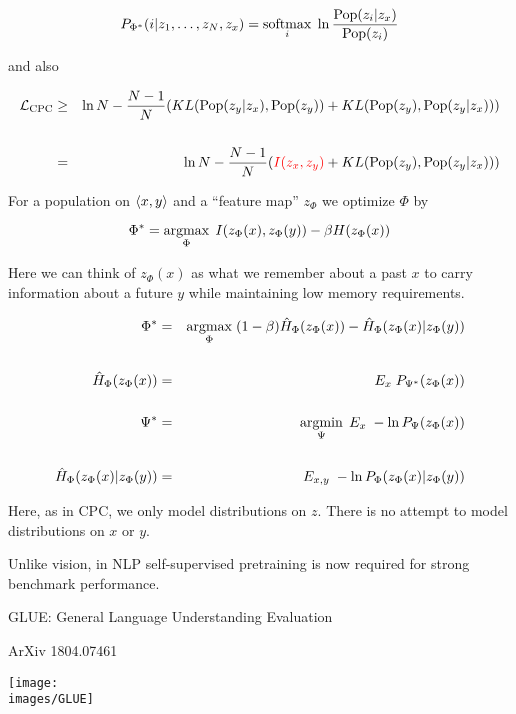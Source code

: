 {$$P_{\Phi^*}(i|z_1,\ldots,z_N,z_x) = \operatorname*{softmax}_i \;\ln \frac{\mathrm{Pop}(z_i|z_x)}{\mathrm{Pop}(z_i)}$$

and also

{\huge
\begin{eqnarray*}
{\cal L}_\mathrm{CPC} & \geq & \ln N - \frac{N-1}{N}(KL(\mathrm{Pop}(z_y|z_x),\mathrm{Pop}(z_y)) + KL(\mathrm{Pop}(z_y),\mathrm{Pop}(z_y|z_x))) \\
\\
& = & \ln N - \frac{N-1}{N}({\color{red} I(z_x,z_y)} + KL(\mathrm{Pop}(z_y),\mathrm{Pop}(z_y|z_x)))
\end{eqnarray*}
}


For a population on ${\mbox{$\langle x,y\rangle$}}$ and a ``feature map'' $z_\Phi$ we optimize $\Phi$ by

\vfill
$$\Phi^* = \operatorname*{argmax}_\Phi \; I(z_\Phi(x),z_\Phi(y)) - \beta H(z_\Phi(x))$$


\vfill
Here we can think of $z_\Phi(x)$ as what we remember about a past $x$ to carry information about a future $y$ while maintaining low memory requirements.


\begin{eqnarray*}
\Phi^* & = & \operatorname*{argmax}_\Phi \; (1-\beta)\hat{H}_\Phi(z_\Phi(x)) - \hat{H}_\Phi(z_\Phi(x)|z_\Phi(y)) \\
\\
\hat{H}_\Phi(z_\Phi(x)) & = & E_x \; P_{\Psi^*}(z_\Phi(x)) \\
\\
\Psi^* & = & \operatorname*{argmin}_\Psi\;E_x\;-\ln P_\Psi(z_\Phi(x)) \\
\\
\hat{H}_\Phi(z_\Phi(x)|z_\Phi(y)) & = & E_{x,y} \; -\ln P_\Phi(z_\Phi(x)|z_\Phi(y)) 
\end{eqnarray*}

\vfill
Here, as in CPC, we only model distributions on $z$.  There is no attempt to model distributions on $x$ or $y$.


Unlike vision, in NLP self-supervised pretraining is now required for strong benchmark performance.

\vfill


GLUE: General Language Understanding Evaluation

\vfill

\centerline{\normalsize ArXiv 1804.07461}
\centerline{\texttt{[image: \\images/GLUE]}}

}
